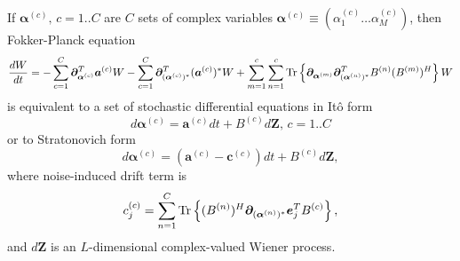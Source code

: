 \begin{theorem}
\label{thm:wigner-bec:fpe:mc-fpe-sde}
If $\bm{\alpha}^{(c)},\, c = 1..C$ are $C$ sets of complex variables $\bm{\alpha}^{(c)} \equiv (\alpha_1^{(c)} \ldots \alpha_M^{(c)})$,
then Fokker-Planck equation
\[
	\frac{dW}{dt}
	= - \sum_{c=1}^C \bm{\partial}_{\bm{\alpha}^{(c)}}^T \bm{a}^{(c)} W
	- \sum_{c=1}^C \bm{\partial}_{(\bm{\alpha}^{(c)})^*}^T (\bm{a}^{(c)})^* W
	+ \sum_{m=1}^c \sum_{n=1}^c
		\mathrm{Tr} \left\{ 
			\bm{\partial}_{\bm{\alpha}^{(m)}}
			\bm{\partial}_{(\bm{\alpha}^{(n)})^*}^T
			B^{(n)} (B^{(m)})^H
		 \right\} W
\]
is equivalent to a set of stochastic differential equations in It\^{o} form
\[
	d\bm{\alpha}^{(c)} = \bm{a}^{(c)} dt + B^{(c)} d\bm{Z},\, c = 1..C
\]
or to Stratonovich form
\[
	d\bm{\alpha}^{(c)} = (\bm{a}^{(c)} - \bm{c}^{(c)}) dt + B^{(c)} d\bm{Z},
\]
where noise-induced drift term is
\[
	c_j^{(c)} = \sum_{n=1}^C
		\mathrm{Tr} \left\{  (B^{(n)})^H \bm{\partial}_{(\bm{\alpha}^{(n)})^*} \bm{e}_j^T B^{(c)}  \right\},
\]
and $d\bm{Z}$ is an $L$-dimensional complex-valued Wiener process.
\end{theorem}
